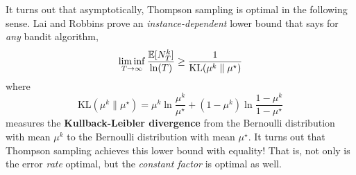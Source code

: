 \documentclass[\main/main]{subfiles}
\begin{document}
It turns out that asymptotically, Thompson sampling is optimal in the following sense. Lai and Robbins \cite{lai_asymptotically_1985} prove an \emph{instance-dependent} lower bound that says for \emph{any} bandit algorithm,
\[
    \liminf_{T \to \infty} \frac{\operatorname*{\mathbb{E}}[N_T^k]}{\ln(T)} \ge \frac{1}{\text{KL}(\mu^k \parallel \mu^\star)}
\]
where \[
    \text{KL}(\mu^k \parallel \mu^\star) = \mu^k \ln \frac{\mu^k}{\mu^\star} + (1 - \mu^k) \ln \frac{1 - \mu^k}{1 - \mu^\star}
\] measures the \textbf{Kullback-Leibler divergence} from the Bernoulli distribution with mean $\mu^k$ to the Bernoulli distribution with mean $\mu^\star$.
It turns out that Thompson sampling achieves this lower bound with equality! That is, not only is the error \emph{rate} optimal, but the \emph{constant factor} is optimal as well.

\iffalse
\section{Gittins index}

\fi
\end{document}
